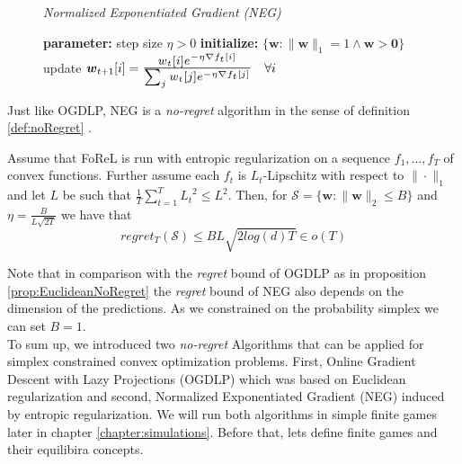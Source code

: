 \begin{figure}[H]\centering
    \textit{Normalized Exponentiated Gradient (NEG)}
    \begin{minipage}{.7\linewidth}
        \begin{algorithm}[H]
        \DontPrintSemicolon
        \textbf{parameter: } step size $\eta > 0$ \;
        \textbf{initialize: } $\{\boldsymbol{w}: \|\boldsymbol{w}\|_1 = 1 \land \boldsymbol{w} > \boldsymbol{0}\}$ \; 
         { 
        update $\boldsymbol{w}_{t+1}[i] = \scaleto{\frac{w_t[i]e^{-\eta\nabla f_t[i]}}{\sum_{j}w_t[j]e^{-\eta\nabla f_t[j]}}}{27pt} \quad \forall i$ \;
        }
        \end{algorithm}\caption*{}
  \end{minipage}
\end{figure}

Just like OGDLP, NEG is a \textit{no-regret} algorithm in the sense of definition \ref{def:noRegret} \cite[Cor. 2.14]{shalev}.

\begin{proposition}\label{prop:EntropicNoRegret}
    Assume that FoReL is run with entropic regularization on a sequence $f_1,\dots,f_T$ of convex functions. Further assume each $f_t$ is $L_t$-Lipschitz with respect to $\|\cdot\|_1$ and let $L$ be such that $\frac{1}{T}\sum_{t=1}^{T}{L_t}^2\le L^2$. Then, for $ \mathcal{S} = \{\boldsymbol{w}: \|\boldsymbol{w}\|_2 \le B\}$ and $\eta = \frac{B}{L\sqrt{2T}}$ we have that
    \[regret_T(\mathcal{S}) \le BL\sqrt{2log(d)T} \in o(T)\]
\end{proposition}

Note that in comparison with the \textit{regret} bound of OGDLP as in proposition \ref{prop:EuclideanNoRegret} the \textit{regret} bound of NEG also depends on the dimension of the predictions. As we constrained on the probability simplex we can set $B = 1$. \\

To sum up, we introduced two \textit{no-regret} Algorithms that can be applied for simplex constrained convex optimization problems. First, Online Gradient Descent with Lazy Projections (OGDLP) which was based on Euclidean regularization and second, Normalized Exponentiated Gradient (NEG) induced by entropic regularization. We will run both algorithms in simple finite games later in chapter \ref{chapter:simulations}. Before that, lets define finite games and their equilibira concepts. 

